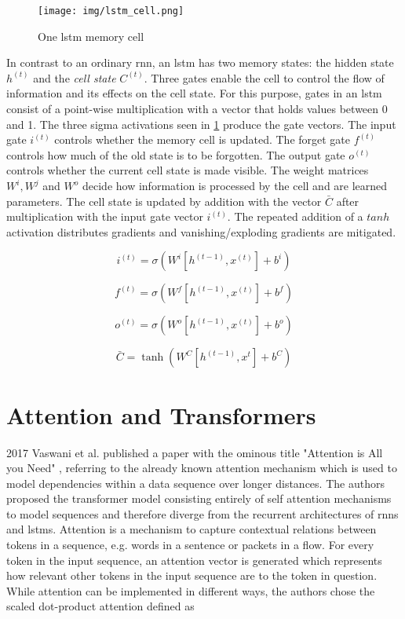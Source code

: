 \begin{figure}[h]
	\centering
	\texttt{[image: img/lstm\_cell.png]}
	\caption{One \gls{lstm} memory cell \cite{rnn_zachary}}
	\label{fig:background:lstm}
\end{figure}

In contrast to an ordinary \gls{rnn}, an \gls{lstm} has two memory states: the hidden state $h^{(t)}$ and the \textit{cell state} $C^{(t)}$. Three gates enable the cell to control the flow of information and its effects on the cell state. For this purpose, gates in an \gls{lstm} consist of a point-wise multiplication with a vector that holds values between 0 and 1. The three sigma activations seen in \ref{fig:background:lstm} produce the gate vectors. The input gate $i^{(t)}$ controls whether the memory cell is updated. The forget gate $f^{(t)}$ controls how much of the old state is to be forgotten. The output gate $o^{(t)}$ controls whether the current cell state is made visible. The weight matrices $W^i, W^j$ and $W^o$ decide how information is processed by the cell and are learned parameters. The cell state is updated by addition with the vector $\bar{C}$ after multiplication with the input gate vector $i^{(t)}$. The repeated addition of a $tanh$ activation distributes gradients and vanishing/exploding gradients are mitigated.

\begin{equation}
i^{(t)} = \sigma(W^i[h^{(t-1)},x^{(t)}] + b^i)
\end{equation}

\begin{equation}
f^{(t)} = \sigma(W^f[h^{(t-1)},x^{(t)}] + b^f)
\end{equation}

\begin{equation}
o^{(t)} = \sigma(W^o[h^{(t-1)},x^{(t)}] + b^o)
\end{equation}

\begin{equation}
\bar{C}=\tanh(W^C[h^{(t-1)},x^{t}]+b^C)
\end{equation}

\section{Attention and Transformers}

2017 Vaswani et al. published a paper with the ominous title "Attention is All you Need" \cite{attention_origin}, referring to the already known attention mechanism which is used to model dependencies within a data sequence over longer distances. The authors proposed the transformer model consisting entirely of self attention mechanisms to model sequences and therefore diverge from the recurrent architectures of \glspl{rnn} and \glspl{lstm}. Attention is a mechanism to capture contextual relations between tokens in a sequence, e.g. words in a sentence or packets in a flow. For every token in the input sequence, an attention vector is generated which represents how relevant other tokens in the input sequence are to the token in question. While attention can be implemented in different ways, the authors chose the scaled dot-product attention defined as 

